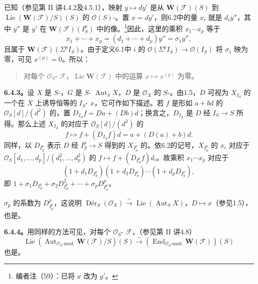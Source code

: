 已知（参见第 II 讲4.4.2及4.5.1），映射 $y\mapsto dy'$ 是从 $\mathbf W(\mathcal F)(S)$ 到 $\operatorname{Lie}(\mathbf W(\mathcal F)/S)(S)$ 的 $\mathcal O(S)$-。置 $x=dy'$，则6.2中的量 $x_i$
就是 $d_iy''$，其中 $y''$ 是 $y'$ 在 $\mathbf W(\mathcal F)(I_S^p)$ 中的像。\footnote{编者注（59）：已将 $x$ 改为 $y'$。}因此，这里的乘积 $x_1\cdots x_p$ 等于
\[
 x_1+\cdots+x_p=(d_1+\cdots+d_p)y''=\sigma_1y'',
\]
且属于 $\mathbf W(\mathcal F)(\Sigma^pI_S)$。由于定义6.1中 $i$ 的 $\mathcal O(\Sigma^pI_S)\to\mathcal O(I_S)$ 将 $\sigma_1$ 映为零，可见 $x^{(p)}=0$。所以：
\begin{quote}
对每个 $\mathcal O_S$- $\mathcal F$，$\operatorname{Lie}\mathbf W(\mathcal F)$ 中的运算 $x\mapsto x^{(p)}$ 为零。
\end{quote}

\textbf{6.4.3。}设 $X$ 是 $S$-，$G$ 是 $S$- $\operatorname{Aut}_SX$，$D$ 是 $\mathcal O_X$ 的 $S$-。由1.5，$D$ 可视为 $X_{I_S}$ 的一个在 $X$ 上诱导恒等的 $I_S$- $x$，它可作如下描述。若 $f$ 是形如 $a+bd$ 的 $\mathcal O_S[d]/(d^2)$ 的，置 $D_{I_S}f=Da+(Db)d$；换言之，$D_{I_S}$ 是 $D$ 经 $I_S\to S$ 所得。那么上述 $X_{I_S}$ 的对应于 $\mathcal O_S[d]/(d^2)$ 的
\[
 f\longmapsto f+(D_{I_S}f)d=a+(D(a)+b)d.
\]
同样，以 $D_{I_S^p}$ 表示 $D$ 经 $I_S^p\to S$ 得到的 $X_{I_S^p}$ 的。依6.2的记号，$X_{I_S^p}$ 的 $x_i$ 对应于 $\mathcal O_S[d_1,\ldots,d_p]/(d_1^2,\ldots,d_p^2)$ 的 $f\mapsto f+(D_{I_S^p}f)d_i$。故乘积 $x_1\cdots x_p$ 对应于
\[
 (1+d_1D_{I_S^p})(1+d_2D_{I_S^p})\cdots(1+d_pD_{I_S^p}),
\]
即 $1+\sigma_1D_{I_S^p}+\sigma_2D_{I_S^p}^2+\cdots+\sigma_pD_{I_S^p}^p$。

$\sigma_p$ 的系数为 $D_{I_S^p}^p$，这说明
$\operatorname{D\text{é}r}_S(\mathcal O_X)\xrightarrow{\sim}\operatorname{Lie}(\operatorname{Aut}_SX)$，$D\mapsto x$（参见1.5），也是。

\textbf{6.4.4。}用同样的方法可见，对每个 $\mathcal O_S$- $\mathcal F$，（参见第 II 讲4.8）
\[
 \operatorname{Lie}(\operatorname{Aut}_{\mathcal O_S\text{-mod.}}\mathbf W(\mathcal F)/S)(S)
 \xrightarrow{\sim}(\operatorname{End}_{\mathcal O_S\text{-mod.}}\mathbf W(\mathcal F))(S)
\]
也是。

